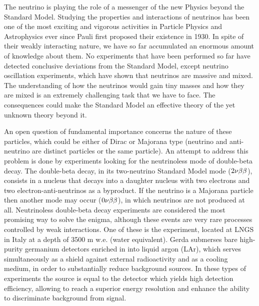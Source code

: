 	The neutrino is playing the role of a messenger of the new Physics beyond the Standard Model. Studying the properties and interactions of neutrinos has been one of the most exciting and vigorous activities in Particle Physics and Astrophysics ever since Pauli first proposed their existence in 1930. In spite of their weakly interacting nature, we have so far accumulated an enormous amount of knowledge about them. No experiments that have been performed so far have detected conclusive deviations from the Standard Model, except neutrino oscillation experiments, which have shown that neutrinos are massive and mixed. The understanding of how the neutrinos would gain tiny masses and how they are mixed is an extremely challenging task that we have to face. The consequences could make the Standard Model an effective theory of the yet unknown theory beyond it.

	An open question of fundamental importance concerns the nature of these particles, which could be either of Dirac or Majorana type (neutrino and anti-neutrino are distinct particles or the same particle). An attempt to address this problem is done by experiments looking for the neutrinoless mode of double-beta decay. The double-beta decay, in its two-neutrino Standard Model mode ($2\nu\beta\beta$), consists in a nucleus that decays into a daughter nucleus with two electrons and two electron-anti-neutrinos as a byproduct. If the neutrino is a Majorana particle then another mode may occur ($0\nu\beta\beta$), in which neutrinos are not produced at all. Neutrinoless double-beta decay experiments are considered the most promising way to solve the enigma, although these events are very rare processes controlled by weak interactions. One of these is the {\gerda} experiment, located at LNGS in Italy at a depth of 3500 m w.e. (water equivalent). Gerda submerses bare high-purity germanium detectors enriched in  into liquid argon (LAr), which serves simultaneously as a shield against external radioactivity and as a cooling medium, in order to substantially reduce background sources. In these types of experiments the source is equal to the detector which yields high detection efficiency, allowing to reach a superior energy resolution and enhance the ability to discriminate background from signal.


